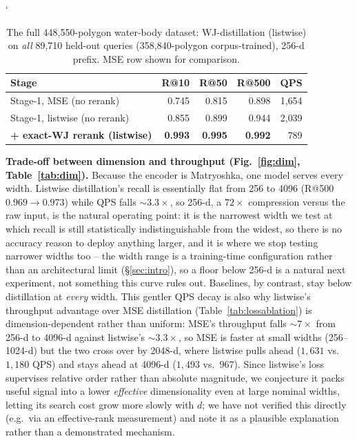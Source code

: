 \documentclass[conference]{IEEEtran}
\begin{document}
\begin{table}[t]\centering
\caption{The full 448,550-polygon water-body dataset: WJ-distillation (listwise) on
\emph{all} 89,710 held-out queries (358,840-polygon corpus-trained), 256-d prefix.
MSE row shown for comparison.}
\label{tab:wbfull}\setlength{\tabcolsep}{4pt}\small`
\begin{tabular}{@{}lrrrr@{}}
\toprule
Stage & R@10 & R@50 & R@500 & QPS \\
\midrule
Stage-1, MSE (no rerank)        & 0.745 & 0.815 & 0.898 & 1{,}654 \\
Stage-1, listwise (no rerank)   & 0.855 & 0.899 & 0.944 & 2{,}039 \\
\textbf{+ exact-WJ rerank (listwise)} & \textbf{0.993} & \textbf{0.995} & \textbf{0.992} & 789 \\
\bottomrule
\end{tabular}
\end{table}

\textbf{Trade-off between dimension and throughput (Fig.~\ref{fig:dim}, Table~\ref{tab:dim}).}
Because the encoder is Matryoshka, one model serves every width. Listwise
distillation's recall is essentially flat from 256 to 4096 (R@500
$0.969\!\to\!0.973$) while QPS falls ${\sim}3.3\times$, so 256-d, a $72\times$
compression versus the raw input, is the natural operating point: it is the narrowest
width we test at which recall is still statistically indistinguishable from the
widest, so there is no accuracy reason to deploy anything larger, and it is where we
stop testing narrower widths too -- the width range is a training-time configuration
rather than an architectural limit (\S\ref{sec:intro}), so a floor below 256-d is a
natural next experiment, not something this curve rules out. Baselines, by contrast, stay below
distillation at \emph{every} width. This gentler QPS decay is also why listwise's
throughput advantage over MSE distillation (Table~\ref{tab:lossablation}) is
dimension-dependent rather than uniform: MSE's throughput falls ${\sim}7\times$ from
256-d to 4096-d against listwise's ${\sim}3.3\times$, so MSE is faster at small widths
(256--1024-d) but the two cross over by 2048-d, where listwise pulls ahead
($1{,}631$ vs.\ $1{,}180$ QPS) and stays ahead at 4096-d ($1{,}493$ vs.\ $967$). Since
listwise's loss supervises relative order rather than absolute magnitude, we conjecture
it packs useful signal into a lower \emph{effective} dimensionality even at large
nominal widths, letting its search cost grow more slowly with $d$; we have not verified
this directly (e.g.\ via an effective-rank measurement) and note it as a plausible
explanation rather than a demonstrated mechanism.
\end{document}
